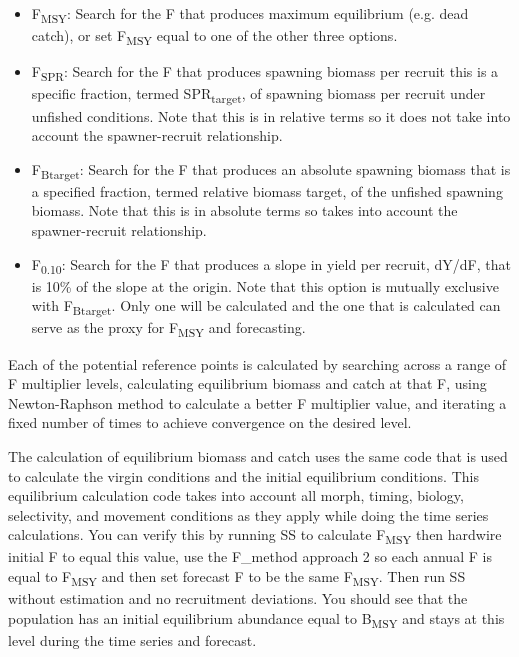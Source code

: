 \begin{itemize}
	\item F\textsubscript{MSY}: Search for the F that produces maximum equilibrium (e.g. dead catch), or set F\textsubscript{MSY} equal to one of the other three options.
	
	\item F\textsubscript{SPR}: Search for the F that produces spawning biomass per recruit this is a specific fraction, termed SPR\textsubscript{target}, of spawning biomass per recruit under unfished conditions. Note that this is in relative terms so it does not take into account the spawner-recruit relationship.
	
	\item F\textsubscript{Btarget}: Search for the F that produces an absolute spawning biomass that is a specified fraction, termed relative biomass target, of the unfished spawning biomass. Note that this is in absolute terms so takes into account the spawner-recruit relationship. 
	
	\item F\textsubscript{0.10}: Search for the F that produces a slope in yield per recruit, dY/dF, that is 10\% of the slope at the origin. Note that this option is mutually exclusive with F\textsubscript{Btarget}. Only one will be calculated and the one that is calculated can serve as the proxy for F\textsubscript{MSY} and forecasting.
\end{itemize}

Each of the potential reference points is calculated by searching across a range of F multiplier levels, calculating equilibrium biomass and catch at that F, using Newton-Raphson method to calculate a better F multiplier value, and iterating a fixed number of times to achieve convergence on the desired level.

The calculation of equilibrium biomass and catch uses the same code that is used to calculate the virgin conditions and the initial equilibrium conditions.  This equilibrium calculation code takes into account all morph, timing, biology, selectivity, and movement conditions as they apply while doing the time series calculations.  You can verify this by running SS to calculate F\textsubscript{MSY} then hardwire initial F to equal this value, use the F\_method approach 2 so each annual F is equal to F\textsubscript{MSY} and then set forecast F to be the same F\textsubscript{MSY}.  Then run SS without estimation and no recruitment deviations.  You should see that the population has an initial equilibrium abundance equal to B\textsubscript{MSY} and stays at this level during the time series and forecast.


